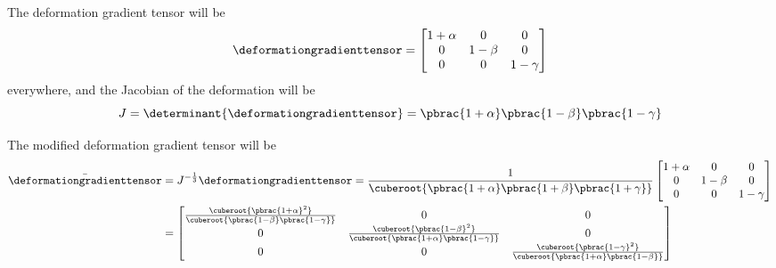 The deformation gradient tensor will be
\begin{equation}
  \deformationgradienttensor= \begin{bmatrix}
    1+\alpha & 0 & 0 \\
    0 & 1-\beta & 0 \\
    0 & 0 & 1-\gamma
  \end{bmatrix}
  \label{eqn:FiniteElasticityUniaxialCubeDeformationGradient}
\end{equation}
everywhere, and the Jacobian of the deformation will be 
\begin{equation}
  J = \determinant{\deformationgradienttensor}=\pbrac{1+\alpha}\pbrac{1-\beta}\pbrac{1-\gamma}
  \label{eqn:FiniteElasticityUniaxialCubeJacobian}
\end{equation}

The modified deformation gradient tensor will be
\begin{equation}
  \begin{split}
    \bar{\deformationgradienttensor}&=J^{-\frac{1}{3}}\deformationgradienttensor=\frac{1}{\cuberoot{\pbrac{1+\alpha}\pbrac{1+\beta}\pbrac{1+\gamma}}}\begin{bmatrix}
      1+\alpha & 0 & 0 \\
      0 & 1-\beta & 0 \\
      0 & 0 & 1-\gamma
    \end{bmatrix}\\
    &=\begin{bmatrix}
    \frac{\cuberoot{\pbrac{1+\alpha}^{2}}}{\cuberoot{\pbrac{1-\beta}\pbrac{1-\gamma}}}
    & 0 & 0 \\
    0 &
    \frac{\cuberoot{\pbrac{1-\beta}^{2}}}{\cuberoot{\pbrac{1+\alpha}\pbrac{1-\gamma}}}
    & 0 \\
    0 & 0 & \frac{\cuberoot{\pbrac{1-\gamma}^{2}}}{\cuberoot{\pbrac{1+\alpha}\pbrac{1-\beta}}}
    \end{bmatrix}
  \end{split}
  \label{eqn:FiniteElasticityUniaxialCubeModDeformationGradient}
\end{equation}

